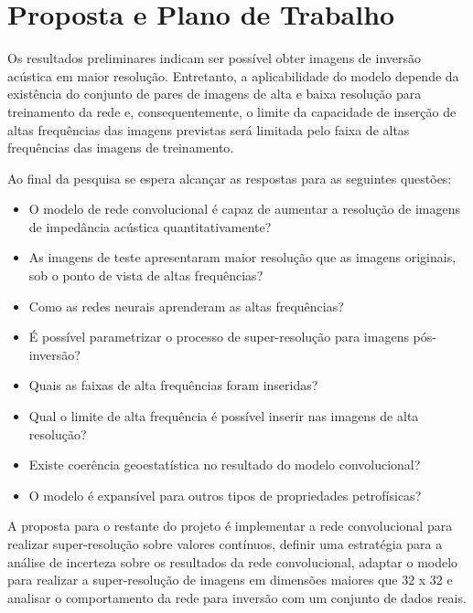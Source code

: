 \section{Proposta e Plano de Trabalho}

Os resultados preliminares indicam ser possível obter imagens de
inversão acústica em maior resolução. Entretanto, a aplicabilidade
do modelo depende da existência do conjunto de pares de imagens
de alta e baixa resolução para treinamento da rede e, consequentemente,
o limite da capacidade de inserção de altas frequências das imagens previstas
será limitada pelo faixa de altas frequências das imagens de treinamento.

Ao final da pesquisa se espera alcançar as respostas para as seguintes questões:
\begin{itemize}
 \item O modelo de rede convolucional é capaz de aumentar a resolução de imagens de impedância acústica
quantitativamente?
 \item As imagens de teste apresentaram maior resolução que as imagens originais, sob o ponto 
de vista de altas frequências?
 \item Como as redes neurais aprenderam as altas frequências?
 \item É possível parametrizar o processo de super-resolução para imagens pós-inversão?
 \item Quais as faixas de alta frequências foram inseridas?
 \item Qual o limite de alta frequência é possível inserir nas imagens de alta resolução?
 \item Existe coerência geoestatística no resultado do modelo convolucional?
 \item O modelo é expansível para outros tipos de propriedades petrofísicas?
\end{itemize}

A proposta para o restante do projeto é implementar a rede convolucional para
realizar super-resolução sobre valores contínuos, definir uma estratégia para
a análise de incerteza sobre os resultados da rede convolucional, adaptar o modelo para realizar a super-resolução
de imagens em dimensões maiores que $32$ x $32$ e analisar o comportamento da rede para inversão
com um conjunto de dados reais.

